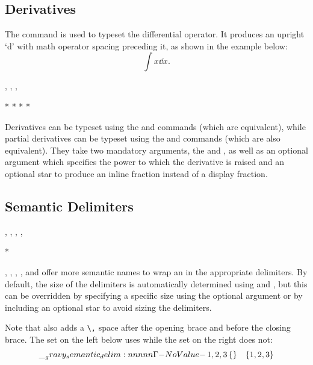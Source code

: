 \documentclass{l3doc}
\begin{document}
\subsection{Derivatives}

\begin{function}{\dd}
  \begin{syntax}
     
  \end{syntax}

  The  command is used to typeset the differential operator. It produces an upright `d' with math operator spacing preceding it, as shown in the example below:
  \[\int x \dd x.\]
\end{function}

\begin{function}{\deriv, \dv, \pderiv, \pdv}
  \begin{syntax}
      *   
         *   
     *   
        *   
  \end{syntax}

  Derivatives can be typeset using the  and  commands (which are equivalent), while partial derivatives can be typeset using the  and  commands (which are also equivalent). They take two mandatory arguments, the  and , as well as an optional argument  which specifies the power to which the derivative is raised and an optional star to produce an inline fraction instead of a display fraction.
\end{function}

\subsection{Semantic Delimiters}

\begin{function}{\abs, \norm, \set, \floor, \ceil}
  \begin{syntax}
     *  
  \end{syntax}

  , , , , and  offer more semantic names to wrap an  in the appropriate delimiters. By default, the size of the delimiters is automatically determined using  and , but this can be overridden by specifying a specific size using the optional  argument or by including an optional star to avoid sizing the delimiters.

  Note that  also adds a \verb|\,| space after the opening brace and before the closing brace. The set on the left below uses  while the set on the right does not: \[ \set{1, 2, 3} \quad \{1, 2, 3\} \]
\end{function}
\end{document}

